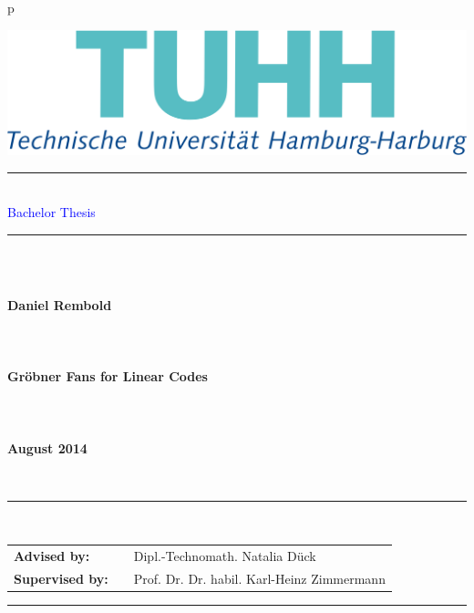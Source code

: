 \begin{tabular}{p{\textwidth}}
\begin{flushright}
\includegraphics[scale=0.15]{figures/tuhh.png}
\end{flushright}


\textcolor{gray}{\rule{15cm}{.8pt}}\\
\vspace{0.01cm}
\LARGE{\textsf{\textcolor{blue}{Bachelor Thesis}}} \\
\textcolor{gray}{\rule{15cm}{.8pt}}

~\\
~\\



\begin{center}
\textbf{\LARGE{Daniel Rembold}}
~\\
~\\
~\\
~\\
\textbf{\LARGE{Gröbner Fans for Linear Codes}}
~\\
~\\
~\\
~\\
\textbf{\large{August 2014}}
\end{center}

~\\
\begin{center}
\textcolor{gray}{\rule{15cm}{.8pt}}\\
\vspace{0.1cm}
\begin{tabular}{lll}
\textbf{Advised by:} & & Dipl.-Technomath. Natalia D\"uck \\
\textbf{Supervised by:} & & Prof. Dr. Dr. habil. Karl-Heinz Zimmermann\\
\end{tabular}
\textcolor{gray}{\rule{15cm}{.8pt}}\\
\end{center}

~\\



\end{tabular}

